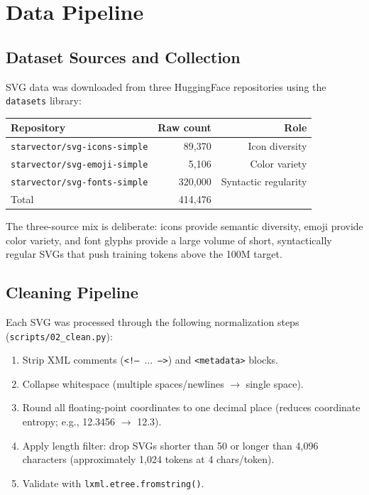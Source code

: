 \documentclass[10pt,letterpaper]{article}
\begin{document}
\section{Data Pipeline}
\label{sec:data}

\subsection{Dataset Sources and Collection}

SVG data was downloaded from three HuggingFace repositories using the
\texttt{datasets} library:

\begin{center}
\begin{tabular}{lrr}
\toprule
Repository & Raw count & Role \\
\midrule
\texttt{starvector/svg-icons-simple}  & 89,370  & Icon diversity \\
\texttt{starvector/svg-emoji-simple}  &  5,106  & Color variety \\
\texttt{starvector/svg-fonts-simple}  & 320,000 & Syntactic regularity \\
\midrule
Total & 414,476 & \\
\bottomrule
\end{tabular}
\end{center}

The three-source mix is deliberate: icons provide semantic diversity, emoji
provide color variety, and font glyphs provide a large volume of short,
syntactically regular SVGs that push training tokens above the 100M target.

\subsection{Cleaning Pipeline}

Each SVG was processed through the following normalization steps
(\texttt{scripts/02\_clean.py}):
\begin{enumerate}[leftmargin=*, nosep]
  \item Strip XML comments (\texttt{<!-- $\ldots$ -->}) and
    \texttt{<metadata>} blocks.
  \item Collapse whitespace (multiple spaces/newlines $\to$ single space).
  \item Round all floating-point coordinates to one decimal place
    (reduces coordinate entropy; e.g., 12.3456 $\to$ 12.3).
  \item Apply length filter: drop SVGs shorter than 50 or longer than 4,096
    characters (approximately 1,024 tokens at 4 chars/token).
  \item Validate with \texttt{lxml.etree.fromstring()}.
\end{enumerate}
\end{document}
